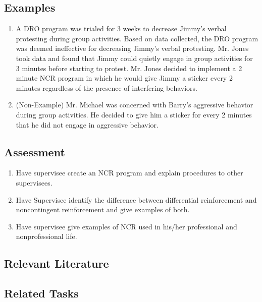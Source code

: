 \subsection{Examples}
\begin{enumerate}
\item A DRO program was trialed for 3 weeks to decrease Jimmy's verbal protesting during group activities. Based on data collected, the DRO program was deemed ineffective for decreasing Jimmy's verbal protesting. Mr. Jones took data and found that Jimmy could quietly engage in group activities for 3 minutes before starting to protest. Mr. Jones decided to implement a 2 minute NCR program in which he would give Jimmy a sticker every 2 minutes regardless of the presence of interfering behaviors.
\item (Non-Example) Mr. Michael was concerned with Barry's aggressive behavior during group activities. He decided to give him a sticker for every 2 minutes that he did not engage in aggressive behavior.
\end{enumerate}
%
\subsection{Assessment}
\begin{enumerate}
\item Have supervisee create an NCR program and explain procedures to other supervisees.
\item Have Supervisee identify the difference between differential reinforcement and noncontingent reinforcement and give examples of both.
\item Have supervisee give examples of NCR used in his/her professional and nonprofessional life.
\end{enumerate}
%
\subsection{Relevant Literature}
\begin{refsection}
\nocite{cautela1984general,
       cooper2007applied,
       hagopian1994schedule,
       ingvarsson2008some,
       wilder2005noncontingent}
\printbibliography[heading=none]
\end{refsection}
%
\subsection{Related Tasks}
\fourbFour{}\\
\fourcOne{}\\
\fourdTwo{}\\
\fourdTwentyOne{}\\
\fourjTwo{}\\
%
%
%
%
%
%
%
%
%
%
%
%
%
%
%
%        
%

